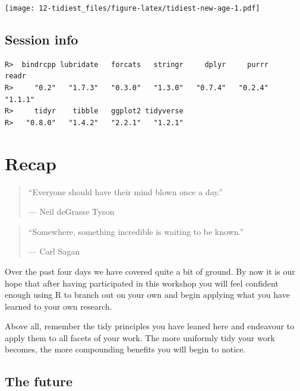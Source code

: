 \documentclass[]{book}
\newenvironment{Shaded}{\begin{snugshade}}{\end{snugshade}}
\newcommand{\KeywordTok}[1]{\textcolor[rgb]{0.13,0.29,0.53}{\textbf{#1}}}
\newcommand{\StringTok}[1]{\textcolor[rgb]{0.31,0.60,0.02}{#1}}
\newcommand{\OperatorTok}[1]{\textcolor[rgb]{0.81,0.36,0.00}{\textbf{#1}}}
\newcommand{\NormalTok}[1]{#1}
\theoremstyle{definition}
\theoremstyle{definition}
\theoremstyle{definition}
\theoremstyle{remark}
\begin{document}
\texttt{[image: 12-tidiest\_files/figure-latex/tidiest-new-age-1.pdf]}

\section{Session info}\label{session-info-11}

\begin{Shaded}
\end{Shaded}

\begin{verbatim}
R>  bindrcpp lubridate   forcats   stringr     dplyr     purrr     readr 
R>     "0.2"   "1.7.3"   "0.3.0"   "1.3.0"   "0.7.4"   "0.2.4"   "1.1.1" 
R>     tidyr    tibble   ggplot2 tidyverse 
R>   "0.8.0"   "1.4.2"   "2.2.1"   "1.2.1"
\end{verbatim}

\chapter{Recap}\label{recap}

\begin{quote}
``Everyone should have their mind blown once a day.''

--- Neil deGrasse Tyson
\end{quote}

\begin{quote}
``Somewhere, something incredible is waiting to be known.''

--- Carl Sagan
\end{quote}

Over the past four days we have covered quite a bit of ground. By now it
is our hope that after having participated in this workshop you will
feel confident enough using R to branch out on your own and begin
applying what you have learned to your own research.

Above all, remember the tidy principles you have leaned here and
endeavour to apply them to all facets of your work. The more uniformly
tidy your work becomes, the more compounding benefits you will begin to
notice.

\section{The future}\label{the-future}
\end{document}
